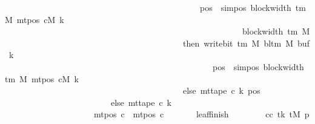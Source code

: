 \begin{isabellebody}
\ \ \ \ \ \ \ \ \ \ \ \ \ \ \ \ \ \ \ \ \ \ \ \ \ \ \ \ \ \ \ \ \ \ \ \ \ \ \ \ \ \ \ \ \ {\isasymand}\ pos\ {\isacharless}{\kern0pt}\ sim{\isacharunderscore}{\kern0pt}pos\ {\isacharparenleft}{\kern0pt}block{\isacharunderscore}{\kern0pt}width\ {\isacharparenleft}{\kern0pt}{\isasymGamma}{\isacharunderscore}{\kern0pt}tm\ M{\isacharparenright}{\kern0pt}{\isacharparenright}{\kern0pt}\ {\isacharparenleft}{\kern0pt}mt{\isacharunderscore}{\kern0pt}pos\ cM\ k{\isacharparenright}{\kern0pt}\isanewline
\ \ \ \ \ \ \ \ \ \ \ \ \ \ \ \ \ \ \ \ \ \ \ \ \ \ \ \ \ \ \ \ \ \ \ \ \ \ \ \ \ \ \ \ \ \ \ \ \ \ \ \ \ \ \ {\isacharplus}{\kern0pt}\ block{\isacharunderscore}{\kern0pt}width\ {\isacharparenleft}{\kern0pt}{\isasymGamma}{\isacharunderscore}{\kern0pt}tm\ M{\isacharparenright}{\kern0pt}\isanewline
\ \ \ \ \ \ \ \ \ \ \ \ \ \ \ \ \ \ \ \ \ \ \ \ \ \ \ \ \ \ \ \ \ \ \ \ \ \ \ \ \ \ then\ write{\isacharunderscore}{\kern0pt}bit\ {\isacharparenleft}{\kern0pt}{\isasymGamma}{\isacharunderscore}{\kern0pt}tm\ M{\isacharparenright}{\kern0pt}\ {\isacharparenleft}{\kern0pt}bl{\isacharunderscore}{\kern0pt}tm\ M{\isacharparenright}{\kern0pt}\ {\isacharparenleft}{\kern0pt}buf\ k{\isacharparenright}{\kern0pt}\isanewline
\ \ \ \ \ \ \ \ \ \ \ \ \ \ \ \ \ \ \ \ \ \ \ \ \ \ \ \ \ \ \ \ \ \ \ \ \ \ \ \ \ \ \ \ \ \ \ \ \ {\isacharparenleft}{\kern0pt}pos\ {\isacharminus}{\kern0pt}\ sim{\isacharunderscore}{\kern0pt}pos\ {\isacharparenleft}{\kern0pt}block{\isacharunderscore}{\kern0pt}width\ {\isacharparenleft}{\kern0pt}{\isasymGamma}{\isacharunderscore}{\kern0pt}tm\ M{\isacharparenright}{\kern0pt}{\isacharparenright}{\kern0pt}\ {\isacharparenleft}{\kern0pt}mt{\isacharunderscore}{\kern0pt}pos\ cM\ k{\isacharparenright}{\kern0pt}{\isacharparenright}{\kern0pt}\isanewline
\ \ \ \ \ \ \ \ \ \ \ \ \ \ \ \ \ \ \ \ \ \ \ \ \ \ \ \ \ \ \ \ \ \ \ \ \ \ \ \ \ \ else\ mt{\isacharunderscore}{\kern0pt}tape\ c{}\ k\ pos{\isacharparenright}{\kern0pt}{\isacharparenright}{\kern0pt}\isanewline
\ \ \ \ \ \ \ \ \ \ \ \ \ \ \ \ \ \ \ \ \ \ \ \ \ else\ mt{\isacharunderscore}{\kern0pt}tape\ c{}\ k{\isacharparenright}{\kern0pt}\isanewline
\ \ \ \ \ \ \ \ \ \ \ \ \ \ \ \ \ \ \ \ {\isasymand}\ mt{\isacharunderscore}{\kern0pt}pos\ c\ {\isacharequal}{\kern0pt}\ mt{\isacharunderscore}{\kern0pt}pos\ c{}{\isacharparenright}{\kern0pt}{\isachardoublequoteclose}\isanewline
\ \ \ \ \ \ \ leaf{\isacharunderscore}{\kern0pt}finish{\isacharcolon}{\kern0pt}\isanewline
\ \ \ \ \ \ \ \ {\isachardoublequoteopen}{\isasymAnd}cc\ tk{\isacharprime}{\kern0pt}\ tM{\isacharprime}{\kern0pt}\ p{\isacharprime}{\kern0pt}{\isachardot}{\kern0pt}\isanewline

\end{isabellebody}
